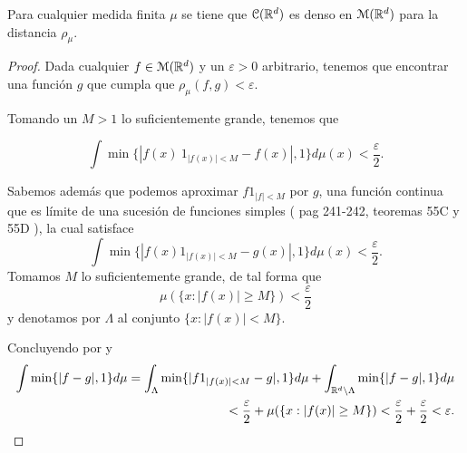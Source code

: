 \begin{lema}\label{lema:A_1_C_es_denso_en_M}
    Para cualquier medida finita $\mu$ se tiene que $\mathcal{C}(\mathbb{R}^d)$ es denso en 
    $\mathcal{M}(\mathbb{R}^d)$ para la distancia $\rho_\mu$.
\end{lema}
\begin{proof}
    Dada cualquier $f \in \mathcal{M}(\mathbb{R}^d)$ y un $\varepsilon > 0$ arbitrario, 
    tenemos que encontrar una función $g$ que cumpla que 
    $\rho_{\mu}(f, g) < \varepsilon$. 

    Tomando un $M > 1$ lo suficientemente grande, tenemos que 
    
    \begin{equation}
        \int \min \{ |f(x)\ 1_{|f(x)| < M} - f(x)|, 1\} d\mu(x)
        < \frac{\varepsilon}{2}. 
    \end{equation}

    Sabemos además que podemos aproximar $f 1_{|f| < M}$ por $g$, una función continua que es límite de una sucesión de
    funciones simples ( pag 241-242,  teoremas 55C y 55D \cite{nla.cat-vn1819421}), 
    la cual satisface 
    \begin{equation}\label{eq:lema3_3_integral}
        \int \min \{ |f(x) 1_{|f(x)| < M} - g(x)|, 1\} d\mu(x) 
        < \frac{\varepsilon}{2}. 
    \end{equation}
    Tomamos $M$ lo suficientemente grande, de tal forma que 
    \begin{equation} \label{eq:lema3_3_medida_conjunto}
        \mu(\{ x: |f(x)| \geq M\}) < \frac{\varepsilon}{2}
    \end{equation}
    y denotamos por $\Lambda$ al conjunto $\{ x: |f(x)| < M\}.$
    
    Concluyendo por  y 
     \begin{equation}
        \begin{split}
            \int \min \{ |f  - g|, 1\} d\mu 
            = 
            \int_\Lambda \min \{ |f1_{|f(x)| < M}  - g|, 1\} d\mu
            + 
            \int_{\mathbb{R}^d \setminus \Lambda} \min \{ |f  - g|, 1\} d\mu 
            \\
            <
            \frac{\varepsilon}{2} 
            + 
            \mu(\{ x: |f(x)| \geq M\}) 
            <
            \frac{\varepsilon}{2} 
            + 
            \frac{\varepsilon}{2} 
            < \varepsilon. 
    \end{split}
    \end{equation}
\end{proof}









